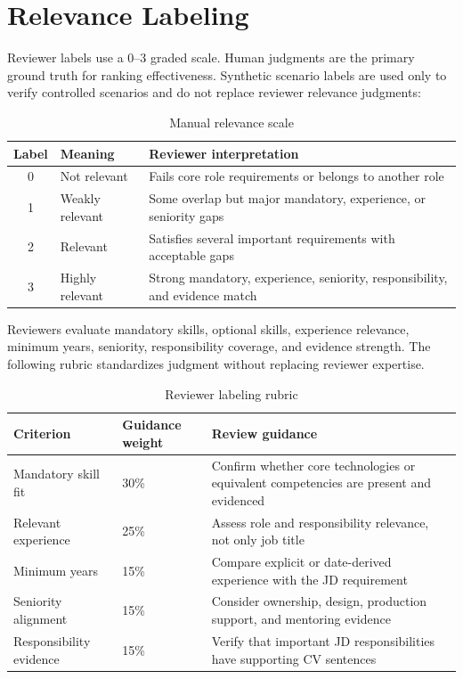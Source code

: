 \documentclass[12pt,a4paper,oneside]{report}
\begin{document}
\section{Relevance Labeling}
Reviewer labels use a 0--3 graded scale. Human judgments are the primary ground truth for ranking effectiveness. Synthetic scenario labels are used only to verify controlled scenarios and do not replace reviewer relevance judgments:
\begin{table}[htbp]
\centering
\caption{Manual relevance scale}
\label{tab:labels}
\begin{tabularx}{\textwidth}{cp{}X}
\toprule
Label & Meaning & Reviewer interpretation \\
\midrule
0 & Not relevant & Fails core role requirements or belongs to another role \\
1 & Weakly relevant & Some overlap but major mandatory, experience, or seniority gaps \\
2 & Relevant & Satisfies several important requirements with acceptable gaps \\
3 & Highly relevant & Strong mandatory, experience, seniority, responsibility, and evidence match \\
\bottomrule
\end{tabularx}
\end{table}

Reviewers evaluate mandatory skills, optional skills, experience relevance, minimum years, seniority, responsibility coverage, and evidence strength. The following rubric standardizes judgment without replacing reviewer expertise.

\begin{table}[htbp]
\centering
\caption{Reviewer labeling rubric}
\label{tab:label-rubric}
\begin{tabularx}{\textwidth}{p{}p{}X}
\toprule
Criterion & Guidance weight & Review guidance \\
\midrule
Mandatory skill fit & 30\% & Confirm whether core technologies or equivalent competencies are present and evidenced \\
Relevant experience & 25\% & Assess role and responsibility relevance, not only job title \\
Minimum years & 15\% & Compare explicit or date-derived experience with the JD requirement \\
Seniority alignment & 15\% & Consider ownership, design, production support, and mentoring evidence \\
Responsibility evidence & 15\% & Verify that important JD responsibilities have supporting CV sentences \\
\bottomrule
\end{tabularx}
\end{table}
\end{document}
